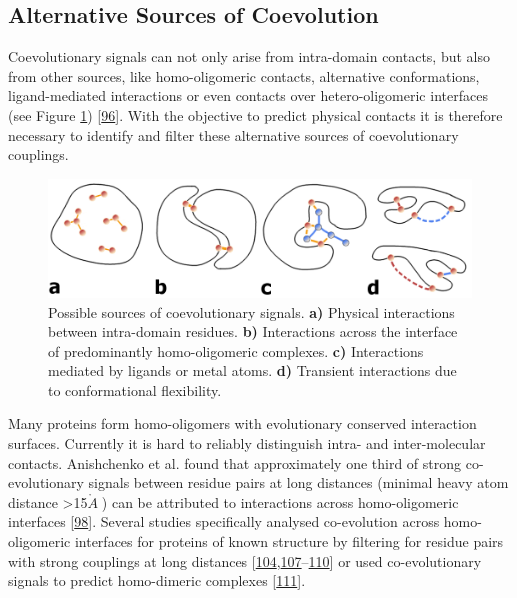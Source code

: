 \documentclass[12pt,a4paper,twoside]{book}
\newcommand{\angstrom}{\mathring{A} \;}
\theoremstyle{definition}
\theoremstyle{definition}
\theoremstyle{remark}
\begin{document}
\subsection*{Alternative Sources of
Coevolution}\label{alternative-sources-of-coevolution}

Coevolutionary signals can not only arise from intra-domain contacts,
but also from other sources, like homo-oligomeric contacts, alternative
conformations, ligand-mediated interactions or even contacts over
hetero-oligomeric interfaces (see Figure \ref{fig:sources-coevolution})
{[}\protect\hyperlink{ref-Marks2012}{96}{]}. With the objective to
predict physical contacts it is therefore necessary to identify and
filter these alternative sources of coevolutionary couplings.








\begin{figure}

{\centering \includegraphics[width=0.9\linewidth]{img/intro/sources_of_coevolution} 

}

\caption{Possible sources of coevolutionary
signals. \textbf{a)} Physical interactions between intra-domain
residues. \textbf{b)} Interactions across the interface of predominantly
homo-oligomeric complexes. \textbf{c)} Interactions mediated by ligands
or metal atoms. \textbf{d)} Transient interactions due to conformational
flexibility.}\label{fig:sources-coevolution}
\end{figure}

Many proteins form homo-oligomers with evolutionary conserved
interaction surfaces. Currently it is hard to reliably distinguish
intra- and inter-molecular contacts. Anishchenko et al. found that
approximately one third of strong co-evolutionary signals between
residue pairs at long distances (minimal heavy atom distance
\textgreater{}15\(\angstrom\)) can be attributed to interactions across
homo-oligomeric interfaces
{[}\protect\hyperlink{ref-Anishchenko2017}{98}{]}. Several studies
specifically analysed co-evolution across homo-oligomeric interfaces for
proteins of known structure by filtering for residue pairs with strong
couplings at long distances
{[}\protect\hyperlink{ref-Hopf2012}{104},\protect\hyperlink{ref-Lee2009}{107}--\protect\hyperlink{ref-Jana2014}{110}{]}
or used co-evolutionary signals to predict homo-dimeric complexes
{[}\protect\hyperlink{ref-DosSantos2015a}{111}{]}.
\end{document}
